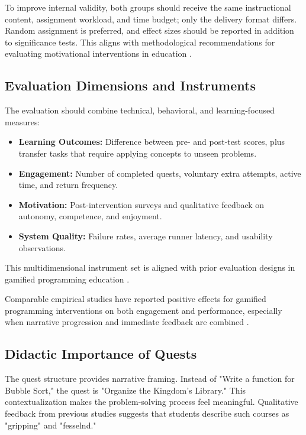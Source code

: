 \documentclass[a4paper, UKenglish, cleveref, autoref, thm-restate]{oasics-v2021}
\begin{document}
To improve internal validity, both groups should receive the same instructional content, assignment workload, and time budget; only the delivery format differs. Random assignment is preferred, and effect sizes should be reported in addition to significance tests. This aligns with methodological recommendations for evaluating motivational interventions in education \cite{treiblmaier2020moderator}.

\subsection{Evaluation Dimensions and Instruments}
The evaluation should combine technical, behavioral, and learning-focused measures:
\begin{itemize}
    \item \textbf{Learning Outcomes:} Difference between pre- and post-test scores, plus transfer tasks that require applying concepts to unseen problems.
    \item \textbf{Engagement:} Number of completed quests, voluntary extra attempts, active time, and return frequency.
    \item \textbf{Motivation:} Post-intervention surveys and qualitative feedback on autonomy, competence, and enjoyment.
    \item \textbf{System Quality:} Failure rates, average runner latency, and usability observations.
\end{itemize}

This multidimensional instrument set is aligned with prior evaluation designs in gamified programming education \cite{figueiredo2020motivation,ibanez2014casestudy,hellin2023engagement}.

Comparable empirical studies have reported positive effects for gamified programming interventions on both engagement and performance, especially when narrative progression and immediate feedback are combined \cite{ibanez2014casestudy,rojaslopez2019engagement,marin2018benefits,costa2023gameconcepts}.

\subsection{Didactic Importance of Quests}
The quest structure provides narrative framing. Instead of "Write a function for Bubble Sort," the quest is "Organize the Kingdom's Library." This contextualization makes the problem-solving process feel meaningful. Qualitative feedback from previous studies \cite{flores2023quest} suggests that students describe such courses as "gripping" and "fesselnd."
\end{document}
